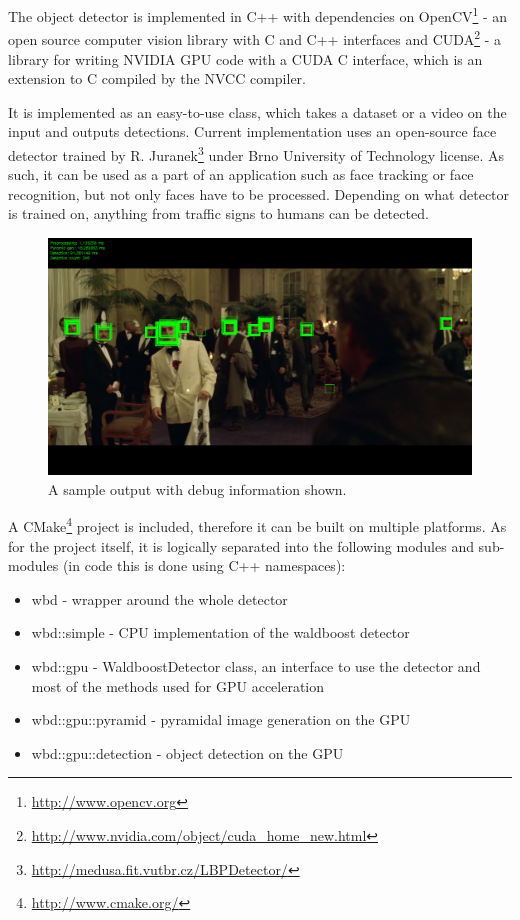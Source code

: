 The object detector is implemented in C++ with dependencies on OpenCV\footnote{\url{http://www.opencv.org}} - an open source computer vision library with C and C++ interfaces and CUDA\footnote{\url{http://www.nvidia.com/object/cuda_home_new.html}} - a library for writing NVIDIA GPU code with a CUDA C interface, which is an extension to C compiled by the NVCC compiler.

It is implemented as an easy-to-use class, which takes a dataset or a video on the input and outputs detections. Current implementation uses an open-source face detector trained by R. Juranek\footnote{\url{http://medusa.fit.vutbr.cz/LBPDetector/}} under Brno University of Technology license. As such, it can be used as a part of an application such as face tracking or face recognition, but not only faces have to be processed. Depending on what detector is trained on, anything from traffic signs to humans can be detected.

\begin{center}
\begin{figure}[h]
	\centering\includegraphics[width=\textwidth]{fig/sample.jpg}
	\caption{A sample output with debug information shown.}
	\label{fig:sample}
\end{figure}
\end{center}

A CMake\footnote{\url{http://www.cmake.org/}} project is included, therefore it can be built on multiple platforms. As for the project itself, it is logically separated into the following modules and sub-modules (in code this is done using C++ namespaces):

\begin{itemize}
	\item wbd - wrapper around the whole detector
	\item wbd::simple - CPU implementation of the waldboost detector
	\item wbd::gpu - WaldboostDetector class, an interface to use the detector and most of the methods used for GPU acceleration
	\item wbd::gpu::pyramid - pyramidal image generation on the GPU
	\item wbd::gpu::detection - object detection on the GPU
\end{itemize}

